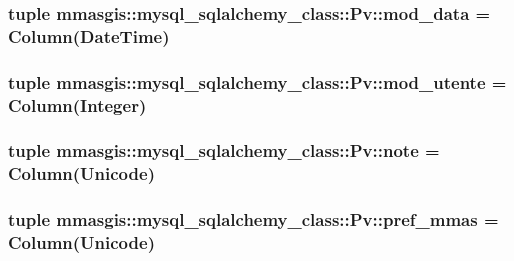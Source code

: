 \label{classmmasgis_1_1mysql__sqlalchemy__class_1_1Pv_a271db5bef67ae1ce813f5a288f04009d}
\hypertarget{classmmasgis_1_1mysql__sqlalchemy__class_1_1Pv_a652936ccc1e8a83d0d7ff94c78377a23}{
\subsubsection[{mod\_\-data}]{\setlength{\rightskip}{0pt plus 5cm}tuple {\bf mmasgis::mysql\_\-sqlalchemy\_\-class::Pv::mod\_\-data} = Column(DateTime)}}
\label{classmmasgis_1_1mysql__sqlalchemy__class_1_1Pv_a652936ccc1e8a83d0d7ff94c78377a23}
\hypertarget{classmmasgis_1_1mysql__sqlalchemy__class_1_1Pv_a03552c6c674c9a27b16c78e8b8710598}{
\subsubsection[{mod\_\-utente}]{\setlength{\rightskip}{0pt plus 5cm}tuple {\bf mmasgis::mysql\_\-sqlalchemy\_\-class::Pv::mod\_\-utente} = Column(Integer)}}
\label{classmmasgis_1_1mysql__sqlalchemy__class_1_1Pv_a03552c6c674c9a27b16c78e8b8710598}
\hypertarget{classmmasgis_1_1mysql__sqlalchemy__class_1_1Pv_acb5fbb6c7616e39e0f29d24f2584210a}{
\subsubsection[{note}]{\setlength{\rightskip}{0pt plus 5cm}tuple {\bf mmasgis::mysql\_\-sqlalchemy\_\-class::Pv::note} = Column(Unicode)}}
\label{classmmasgis_1_1mysql__sqlalchemy__class_1_1Pv_acb5fbb6c7616e39e0f29d24f2584210a}
\hypertarget{classmmasgis_1_1mysql__sqlalchemy__class_1_1Pv_a297d88858ae29fc942723e13262e5498}{
\subsubsection[{pref\_\-mmas}]{\setlength{\rightskip}{0pt plus 5cm}tuple {\bf mmasgis::mysql\_\-sqlalchemy\_\-class::Pv::pref\_\-mmas} = Column(Unicode)}}
